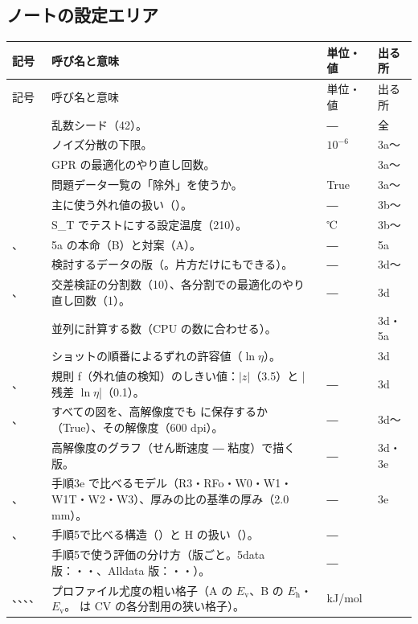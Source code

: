 \documentclass[paper=a4paper,fontsize=10.5pt,line_length=44zw,number_of_lines=38]{jlreq}
\makeatletter
\newcommand{\file}[1]{\texttt{\detokenize{#1}}}
\newcommand{\Eh}{E_{\mathrm{h}}}
\newcommand{\Ev}{E_{\mathrm{v}}}
\newenvironment{symtab}{%
  \begin{longtable}{@{}>{\raggedright\arraybackslash}p{6.5\zw}>{\raggedright\arraybackslash}p{22\zw}>{\raggedright\arraybackslash}p{6\zw}>{\raggedright\arraybackslash}p{4.5\zw}@{}}
  \toprule 記号 & 呼び名と意味 & 単位・値 & 出る所 \\ \midrule \endfirsthead
  \toprule 記号 & 呼び名と意味 & 単位・値 & 出る所 \\ \midrule \endhead
  \bottomrule \endlastfoot}{\end{longtable}}
\makeatother
\begin{document}
\subsection{ノートの設定エリア}
\begin{symtab}
\file{SEED} & 乱数シード（42）。 & ― & 全 \\
\file{NOISE_LB} & ノイズ分散の下限。 & $10^{-6}$ & 3a〜 \\
\file{N_RESTARTS} & GPR の最適化のやり直し回数。 & 5 & 3a〜 \\
\file{USE_EXCLUSIONS} & 問題データ一覧の「除外」を使うか。 & True & 3a〜 \\
\file{MAIN_DATA} & 主に使う外れ値の扱い（\file{なし}）。 & ― & 3b〜 \\
\file{TEMP_HOLDOUT} & S\_T でテストにする設定温度（210）。 & ℃ & 3b〜 \\
\file{MAIN_STRUCT}、\file{ALT_STRUCT} & 5a の本命（B）と対案（A）。 & ― & 5a \\
\file{DATA_VERSIONS} & 検討するデータの版（\file{["5data", "Alldata"]}。片方だけにもできる）。 & ― & 3d〜 \\
\file{CV_K}、\file{N_RESTARTS_CV} & 交差検証の分割数（10）、各分割での最適化のやり直し回数（1）。 & ― & 3d \\
\file{N_JOBS} & 並列に計算する数（CPU の数に合わせる）。 & 6 & 3d・5a \\
\file{DRIFT_TOL} & ショットの順番によるずれの許容値（$\ln\eta$）。 & 0.02 & 3d \\
\file{OUTLIER_Z}、\file{OUTLIER_RESID} & 規則 f（外れ値の検知）のしきい値：$|z|$（3.5）と |残差 $\ln\eta$|（0.1）。 & ― & 3d \\
\file{HR_ALL}、\file{HR_ALL_DPI} & すべての図を、高解像度でも \file{highres/} に保存するか（True）、その解像度（600 dpi）。 & ― & 3d〜 \\
\file{HR_VERSIONS} & 高解像度のグラフ（せん断速度 ― 粘度）で描く版。 & ― & 3d・3e \\
\file{KEYS}、\file{REF_H} & 手順3e で比べるモデル（R3・RFo・W0・W1・W1T・W2・W3）、厚みの比の基準の厚み（2.0 mm）。 & ― & 3e \\
\file{STRUCTS}、\file{H_VARIANTS} & 手順5で比べる構造（\file{["B", "A", "C"]}）と H の扱い（\file{["1", "2", "4", "14", "24"]}）。 & ― & 5 \\
\file{SPLITS} & 手順5で使う評価の分け方（版ごと。5data 版：\file{S_V}・\file{S_T}・\file{CV}、Alldata 版：\file{S_T}・\file{CV}・\file{S_Vall}）。 & ― & 5 \\
\file{E_GRID_A}、\file{EH_GRID}、\file{EV_GRID}、\file{EH_GRID_CV}、\file{EV_GRID_CV} & プロファイル尤度の粗い格子（A の $\Ev$、B の $\Eh$・$\Ev$。\file{_CV} は CV の各分割用の狭い格子）。 & kJ/mol & 5 \\

\end{symtab}
\end{document}
